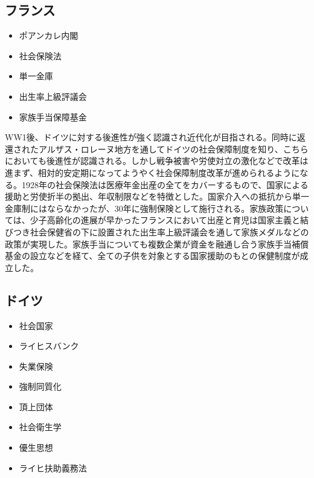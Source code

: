 \documentclass{jsarticle}
\begin{document}
\subsection{フランス}
\begin{itemize}
	\item ポアンカレ内閣
	\item 社会保険法
	\item 単一金庫
	\item 出生率上級評議会
	\item 家族手当保障基金
\end{itemize}

WW1後、ドイツに対する後進性が強く認識され近代化が目指される。同時に返還されたアルザス・ロレーヌ地方を通してドイツの社会保障制度を知り、こちらにおいても後進性が認識される。しかし戦争被害や労使対立の激化などで改革は進まず、相対的安定期になってようやく社会保障制度改革が進められるようになる。1928年の社会保険法は医療年金出産の全てをカバーするもので、国家による援助と労使折半の拠出、年収制限などを特徴とした。国家介入への抵抗から単一金庫制にはならなかったが、30年に強制保険として施行される。家族政策については、少子高齢化の進展が早かったフランスにおいて出産と育児は国家主義と結びつき社会保健省の下に設置された出生率上級評議会を通して家族メダルなどの政策が実現した。家族手当についても複数企業が資金を融通し合う家族手当補償基金の設立などを経て、全ての子供を対象とする国家援助のもとの保健制度が成立した。

\subsection{ドイツ}
\begin{itemize}
	\item 社会国家
	\item ライヒスバンク
	\item 失業保険
	\item 強制同質化
	\item 頂上団体
	\item 社会衛生学
	\item 優生思想
	\item ライヒ扶助義務法
\end{itemize}
\end{document}
